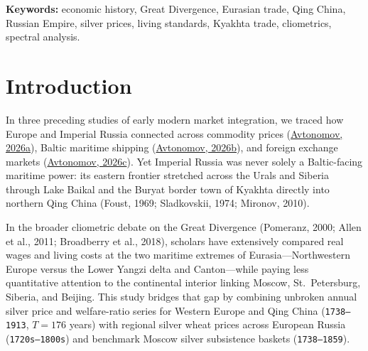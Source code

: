 \documentclass[11pt,a4paper]{article}
\begin{document}
\noindent\textbf{Keywords:} economic history, Great Divergence, Eurasian trade, Qing China, Russian Empire, silver prices, living standards, Kyakhta trade, cliometrics, spectral analysis.

\section{Introduction}

In three preceding studies of early modern market integration, we traced how Europe and Imperial Russia connected across commodity prices (\href{https://doi.org}{Avtonomov, 2026a}), Baltic maritime shipping (\href{https://doi.org}{Avtonomov, 2026b}), and foreign exchange markets (\href{https://doi.org}{Avtonomov, 2026c}). Yet Imperial Russia was never solely a Baltic-facing maritime power: its eastern frontier stretched across the Urals and Siberia through Lake Baikal and the Buryat border town of Kyakhta directly into northern Qing China (Foust, 1969; Sladkovskii, 1974; Mironov, 2010).

In the broader cliometric debate on the Great Divergence (Pomeranz, 2000; Allen et al., 2011; Broadberry et al., 2018), scholars have extensively compared real wages and living costs at the two maritime extremes of Eurasia—Northwestern Europe versus the Lower Yangzi delta and Canton—while paying less quantitative attention to the continental interior linking Moscow, St.~Petersburg, Siberia, and Beijing. This study bridges that gap by combining unbroken annual silver price and welfare-ratio series for Western Europe and Qing China (\texttt{1738--1913}, $T = 176$ years) with regional silver wheat prices across European Russia (\texttt{1720s--1800s}) and benchmark Moscow silver subsistence baskets (\texttt{1738--1859}).
\end{document}
